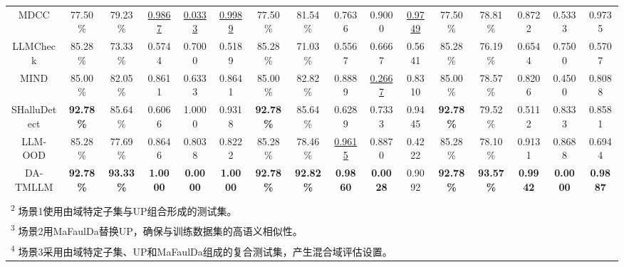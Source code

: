\documentclass[UTF8,lettersize,journal]{IEEEtran}
\begin{document}
\begin{table}[t!]
\begin{tabular}{c|ccccc|ccccc|ccccc}
		\noalign{\vspace{2.8pt}}\hline\noalign{\smallskip}
		MDCC  & 77.50\% & 79.23\% & \underline{0.9867}  & \underline{0.0333}  & \underline{0.9989}  & 77.50\% & 81.54\% & 0.7636  & 0.9000  & \underline{0.9749}  & 77.50\% & 78.81\% & 0.8722  & 0.5333  & 0.9735  \\
		\noalign{\vspace{2.8pt}}\hline\noalign{\smallskip}
		LLMCheck & 85.28\% & 73.33\% & 0.5744  & 0.7000  & 0.5189  & 85.28\% & 71.03\% & 0.5567  & 0.6667  & 0.5641  & 85.28\% & 76.19\% & 0.6544  & 0.7500  & 0.5707  \\
		\noalign{\vspace{2.8pt}}\hline\noalign{\smallskip}
		MIND  & 85.00\% & 82.05\% & 0.8611  & 0.6333  & 0.8641  & 85.00\% & 82.82\% & 0.8889  & \underline{0.2667}  & 0.8310  & 85.00\% & 78.57\% & 0.8206  & 0.4500  & 0.8088  \\
		\noalign{\vspace{2.8pt}}\hline\noalign{\smallskip}
		SHalluDetect & \textbf{92.78\%} & 85.64\% & 0.6066  & 1.0000  & 0.9318  & \textbf{92.78\%} & 85.64\% & 0.6289  & 0.7333  & 0.9445  & \textbf{92.78\%} & 79.52\% & 0.5112  & 0.8333  & 0.8581  \\
		\noalign{\vspace{2.8pt}}\hline\noalign{\smallskip}
		LLM-OOD & 85.28\% & 77.69\% & 0.8646  & 0.8038  & 0.8222  & 85.28\% & 78.46\% & \underline{0.9615}  & 0.8870  & 0.4222  & 85.28\% & 78.10\% & 0.9131  & 0.8688  & 0.6944  \\
		\noalign{\vspace{2.8pt}}\hline\noalign{\smallskip}
		DA-TMLLM & \textbf{92.78\%} & \textbf{93.33\% }& \textbf{1.0000}  & \textbf{0.0000}  & \textbf{1.0000}  & \textbf{92.78\%} & \textbf{92.82\%} & \textbf{0.9860}  & \textbf{0.0028}  & 0.9092  & \textbf{92.78\%} & \textbf{93.57\%} & \textbf{0.9942}  & \textbf{0.0000}  & \textbf{0.9887}  \\
		\noalign{\vspace{0.5pt}}
		\bottomrule[1pt]
		\multicolumn{13}{l}{\textsuperscript{1} 最佳结果：\textbf{粗体}；次佳结果：\underline{下划线}。}\\	[-5pt]
		\multicolumn{13}{l}{\textsuperscript{2} 场景1使用由域特定子集与UP组合形成的测试集。}\\	[-5pt]
		\multicolumn{13}{l}{\textsuperscript{3} 场景2用MaFaulDa替换UP，确保与训练数据集的高语义相似性。}\\	[-5pt]
		\multicolumn{16}{l}{\textsuperscript{4} 场景3采用由域特定子集、UP和MaFaulDa组成的复合测试集，产生混合域评估设置。}\\	[-5pt]
	\end{tabular}
\end{table}
\setlength{\tabcolsep}{6pt}
\end{document}
